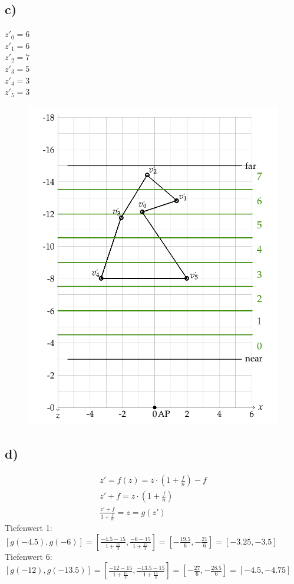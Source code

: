 \documentclass[a4paper,10pt,DIV=14]{article}
\begin{document}
\subsection{c)}
$z'_0 = 6$\\
$z'_1 = 6$\\
$z'_2 = 7$\\
$z'_3 = 5$\\
$z'_4 = 3$\\
$z'_5 = 3$
\begin{figure}[!htbp]
	\centering
	\includegraphics[width=1\linewidth]{2c}
\end{figure}
\subsection{d)}
\begin{align*}
    z' = f(z) = z \cdot \left( 1 + \frac{f}{n} \right) -f\\
    z' + f = z \cdot \left( 1 + \frac{f}{n} \right)\\
    \frac{z' + f}{1 + \frac{f}{n}} = z = g(z')
\end{align*}
Tiefenwert 1:\\
$\left[ g(-4.5), g(-6) \right] = \left[ \frac{-4.5 - 15}{1 + \frac{15}{3}} , \frac{-6 - 15}{1 + \frac{15}{3}} \right] = \left[ -\frac{19.5}{6} , -\frac{21}{6} \right] = \left[ -3.25 , -3.5 \right]$\\
Tiefenwert 6:\\
$\left[ g(-12), g(-13.5) \right] = \left[ \frac{-12 - 15}{1 + \frac{15}{3}} , \frac{-13.5 - 15}{1 + \frac{15}{3}} \right] = \left[ -\frac{27}{6} , -\frac{28.5}{6} \right] = \left[ -4.5 , -4.75 \right]$
\end{document}
